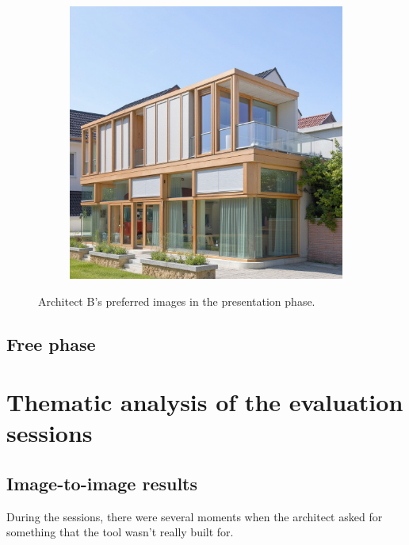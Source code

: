\begin{figure}[H]
\begin{subfigure}[b]{0.3\textwidth}
        \caption{}
        \label{fig:B-presentation-preferred-b}
    \end{subfigure}
    \hfill
    \begin{subfigure}[b]{0.3\textwidth}
        \centering
        \includegraphics[width=\textwidth]{Images/Results/Architect B/3. Presentation phase/Met_lora_00074_.png}
        \caption{}
        \label{fig:B-presentation-preferred-c}
    \end{subfigure}
    \caption{Architect B's preferred images in the presentation phase.}
    \label{fig:B-presentation-preferred}
\end{figure}
\subsection{Free phase}

\section{Thematic analysis of the evaluation sessions}
\subsection{Image-to-image results}
During the sessions, there were several moments when the architect asked for something that the tool wasn't really built for.
